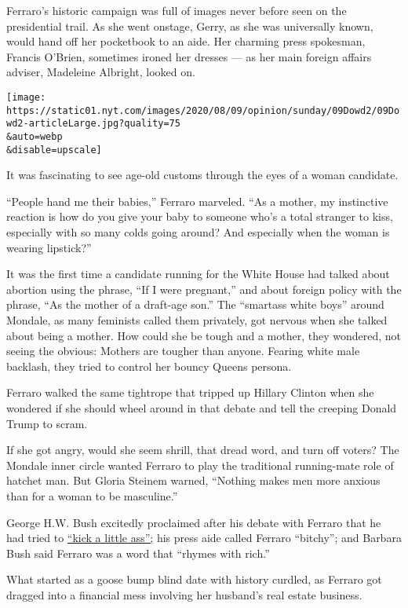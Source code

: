 Ferraro's historic campaign was full of images never before seen on the
presidential trail. As she went onstage, Gerry, as she was universally
known, would hand off her pocketbook to an aide. Her charming press
spokesman, Francis O'Brien, sometimes ironed her dresses --- as her main
foreign affairs adviser, Madeleine Albright, looked on.

\texttt{[image: https://static01.nyt.com/images/2020/08/09/opinion/sunday/09Dowd2/09Dowd2-articleLarge.jpg?quality=75\\\&auto=webp\\\&disable=upscale]}

It was fascinating to see age-old customs through the eyes of a woman
candidate.

``People hand me their babies,'' Ferraro marveled. ``As a mother, my
instinctive reaction is how do you give your baby to someone who's a
total stranger to kiss, especially with so many colds going around? And
especially when the woman is wearing lipstick?''

It was the first time a candidate running for the White House had talked
about abortion using the phrase, ``If I were pregnant,'' and about
foreign policy with the phrase, ``As the mother of a draft-age son.''
The ``smartass white boys'' around Mondale, as many feminists called
them privately, got nervous when she talked about being a mother. How
could she be tough and a mother, they wondered, not seeing the obvious:
Mothers are tougher than anyone. Fearing white male backlash, they tried
to control her bouncy Queens persona.

Ferraro walked the same tightrope that tripped up Hillary Clinton when
she wondered if she should wheel around in that debate and tell the
creeping Donald Trump to scram.

If she got angry, would she seem shrill, that dread word, and turn off
voters? The Mondale inner circle wanted Ferraro to play the traditional
running-mate role of hatchet man. But Gloria Steinem warned, ``Nothing
makes men more anxious than for a woman to be masculine.''

George H.W. Bush excitedly proclaimed after his debate with Ferraro that
he had tried to
\href{https://www.nytimes.com/1984/10/14/us/aide-to-ferraro-demands-bush-make-apology.html}{``kick
a little ass'';} his press aide called Ferraro ``bitchy''; and Barbara
Bush said Ferraro was a word that ``rhymes with rich.''

What started as a goose bump blind date with history curdled, as Ferraro
got dragged into a financial mess involving her husband's real estate
business.


